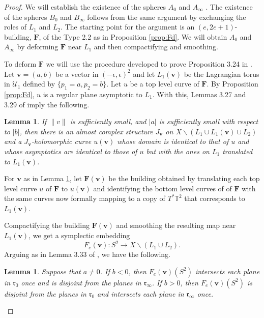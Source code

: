 \documentclass[12pt]{amsart}
\newtheorem{lemma}[theorem]{Lemma}
\theoremstyle{definition}
\newcommand{\TT}{{\mathbb T}}
\begin{document}
\begin{proof} We will establish the existence of the spheres $A_0$ and $A_{\infty}$ . The existence of the spheres $B_0$ and $B_{\infty}$ follows from the same argument by exchanging the roles of $L_1$ and $L_2$.  The starting point for the argument is an $(e,2e+1)$-building, $\mathbf{F}$, of the Type 2.2 as in Proposition \ref{prop:Fd}. We will obtain $A_0$ and $A_{\infty}$ by  deforming $\mathbf{F}$ near $L_1$ and then compactifying and smoothing.  


To deform  $\mathbf{F}$ we will use the procedure developed to prove Proposition 3.24 in \cite{hiker}. Let $\mathbf{v} =(a,b)$ be a vector in $(-\epsilon, \epsilon)^2$ and let $L_1(\mathbf{v})$ be the Lagrangian torus in $\mathcal{U}_1$ defined by $\{p_1=a, p_2=b\}$. Let $u$ be a top level curve of $\mathbf{F}$. By Proposition \ref{prop:Fd}, $u$ is a regular plane asymptotic to $L_1$. With this,  Lemmas 3.27 and 3.29 of \cite{hiker} imply the following.

\begin{lemma}\label{lem:shift1}
 If $\|v\|$ is sufficiently small, and $|a|$ is sufficiently small with respect to $|b|$, then there is an almost complex structure $J_{\mathbf{v}}$ on $X \smallsetminus (L_1 \cup L_1(\mathbf{v})\cup L_2)$ and a $J_{\mathbf{v}}$-holomorphic curve $u(\mathbf{v})$ whose domain is identical to that of $u$ and whose asymptotics are identical to those of $u$ but with the ones on $L_1$ translated to  $L_1(\mathbf{v})$. 
\end{lemma}

For  $\mathbf{v}$ as in Lemma \ref{lem:shift1}, let $\mathbf{F}(\mathbf{v})$ be the building obtained by translating each top level curve $u$ of $\mathbf{F}$ to $u(\mathbf{v})$ and identifying the bottom level curves of of $\mathbf{F}$ with the same curves now formally mapping to a copy of $T^*\TT^2$  that corresponds to $L_1(\mathbf{v})$. 

Compactifying the building $\mathbf{F}(\mathbf{v})$ and smoothing the resulting map near $L_1(\mathbf{v})$, we get a symplectic  embedding $$F_e(\mathbf{v}) \colon S^2 \to X \smallsetminus (L_1 \cup L_2).$$ Arguing as in  Lemma 3.33 of \cite{hiker}, we have the following. 

\begin{lemma}\label{lem:shift2}
   Suppose that  $a \neq 0$. If $b<0$, then $F_e(\mathbf{v})(S^2)$ intersects each plane in $\mathfrak{r}_0$ once and is disjoint from the planes in $\mathfrak{r}_{\infty}$. If $b>0$, then $F_e(\mathbf{v})(S^2)$ is disjoint from the planes in $\mathfrak{r}_0$ and intersects each plane in $\mathfrak{r}_{\infty}$ once.
 \end{lemma}


\end{proof}
\end{document}
